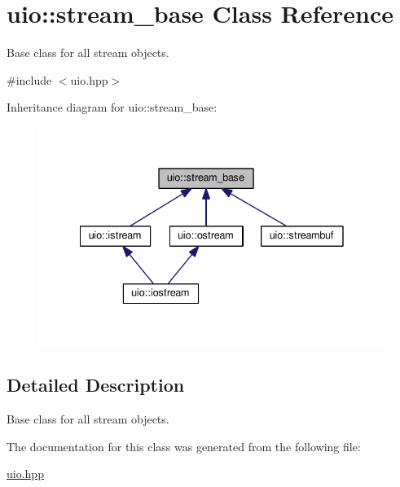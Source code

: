 \hypertarget{classuio_1_1stream__base}{}\section{uio\+:\+:stream\+\_\+base Class Reference}
\label{classuio_1_1stream__base}


Base class for all stream objects.  




{\ttfamily \#include $<$uio.\+hpp$>$}



Inheritance diagram for uio\+:\+:stream\+\_\+base\+:\nopagebreak
\begin{figure}[H]
\begin{center}
\leavevmode
\includegraphics[width=335pt]{classuio_1_1stream__base__inherit__graph}
\end{center}
\end{figure}


\subsection{Detailed Description}
Base class for all stream objects. 

The documentation for this class was generated from the following file\+:\begin{DoxyCompactItemize}
\item 
\hyperlink{uio_8hpp}{uio.\+hpp}\end{DoxyCompactItemize}
